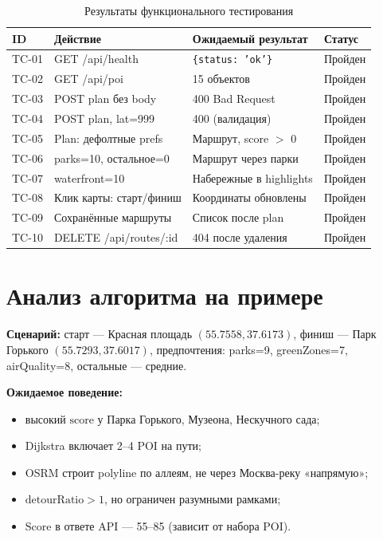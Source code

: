 \begin{table}[H]
\centering
\caption{Результаты функционального тестирования}
\label{tab:test-cases}
\small
\begin{tabular}{@{}p{1.2cm}p{4.2cm}p{4.5cm}p{2.5cm}@{}}
\toprule
\textbf{ID} & \textbf{Действие} & \textbf{Ожидаемый результат} & \textbf{Статус} \\
\midrule
TC-01 & GET /api/health & \texttt{\{status: 'ok'\}} & Пройден \\
TC-02 & GET /api/poi & 15 объектов & Пройден \\
TC-03 & POST plan без body & 400 Bad Request & Пройден \\
TC-04 & POST plan, lat=999 & 400 (валидация) & Пройден \\
TC-05 & Plan: дефолтные prefs & Маршрут, score $>$ 0 & Пройден \\
TC-06 & parks=10, остальное=0 & Маршрут через парки & Пройден \\
TC-07 & waterfront=10 & Набережные в highlights & Пройден \\
TC-08 & Клик карты: старт/финиш & Координаты обновлены & Пройден \\
TC-09 & Сохранённые маршруты & Список после plan & Пройден \\
TC-10 & DELETE /api/routes/:id & 404 после удаления & Пройден \\
\bottomrule
\end{tabular}
\end{table}

\section{Анализ алгоритма на примере}

\textbf{Сценарий:} старт --- Красная площадь $(55.7558, 37.6173)$, финиш --- Парк
Горького $(55.7293, 37.6017)$, предпочтения: parks=9, greenZones=7, airQuality=8,
остальные --- средние.

\textbf{Ожидаемое поведение:}
\begin{itemize}
  \item высокий $\mathrm{score}$ у Парка Горького, Музеона, Нескучного сада;
  \item Dijkstra включает 2--4 POI на пути;
  \item OSRM строит polyline по аллеям, не через Москва-реку «напрямую»;
  \item $\mathrm{detourRatio} > 1$, но ограничен разумными рамками;
  \item $\mathrm{Score}$ в ответе API --- 55--85 (зависит от набора POI).
\end{itemize}

